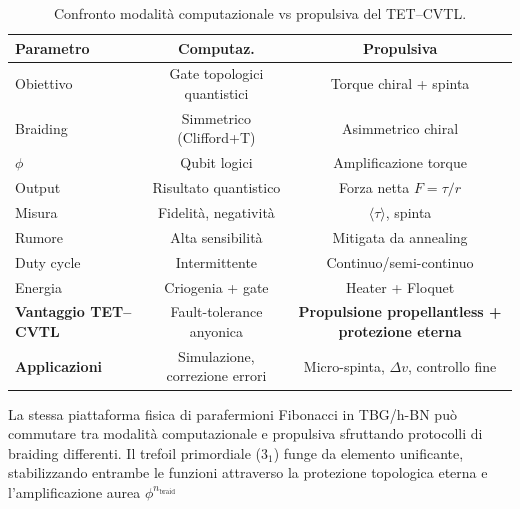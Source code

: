 \documentclass[11pt,a4paper]{article}
\theoremstyle{plain}
\theoremstyle{definition}
\begin{document}
\begin{table}[H]
\centering
\footnotesize
\renewcommand{\arraystretch}{1.6}

\begin{tabular}{l@{\quad}cc}
\toprule
\rowcolor{teal!18}
\textbf{Parametro} & \textbf{Computaz.} & \textbf{Propulsiva} \\
\midrule
Obiettivo      & Gate topologici quantistici & Torque chiral + spinta \\
Braiding       & Simmetrico (Clifford+T)     & Asimmetrico chiral \\
\(\phi\)       & Qubit logici                & Amplificazione torque \\
Output         & Risultato quantistico       & Forza netta \(F=\tau/r\) \\
Misura         & Fidelità, negatività        & \(\langle\tau\rangle\), spinta \\
Rumore         & Alta sensibilità            & Mitigata da annealing \\
Duty cycle     & Intermittente               & Continuo/semi-continuo \\
Energia        & Criogenia + gate            & Heater + Floquet \\
\rowcolor{emerald!22}
\textbf{Vantaggio TET--CVTL} & Fault-tolerance anyonica & \textbf{Propulsione propellantless + protezione eterna} \\
\rowcolor{emerald!15}
\textbf{Applicazioni} & Simulazione, correzione errori & Micro-spinta, \(\Delta v\), controllo fine \\
\bottomrule
\end{tabular}

\vspace{12pt}

\vspace{0.2cm}

{\small La stessa piattaforma fisica di parafermioni Fibonacci in TBG/h-BN può commutare tra modalità computazionale e propulsiva sfruttando protocolli di braiding differenti.  Il trefoil primordiale (\(3_1\)) funge da elemento unificante, stabilizzando entrambe le funzioni attraverso la protezione topologica eterna e l'amplificazione aurea \(\phi^{n_{\text{braid}}}\)}

\caption{Confronto modalità computazionale vs propulsiva del TET--CVTL.}
\label{tab:computational_vs_propulsive}
\end{table}



\vspace{0.4cm}
\end{document}
